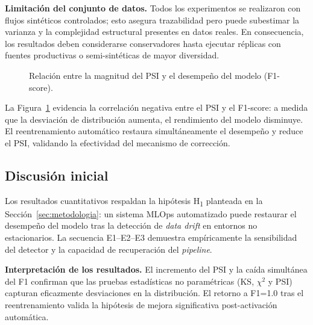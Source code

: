 \noindent\textbf{Limitación del conjunto de datos.} Todos los experimentos se realizaron con flujos sintéticos controlados; esto asegura trazabilidad pero puede subestimar la varianza y la complejidad estructural presentes en datos reales. En consecuencia, los resultados deben considerarse conservadores hasta ejecutar réplicas con fuentes productivas o semi-sintéticas de mayor diversidad.

\begin{figure}[H]
\centering
{}
\caption{Relación entre la magnitud del PSI y el desempeño del modelo (F1-score).}
\label{fig:psi-f1}
\end{figure}


La Figura~\ref{fig:psi-f1} evidencia la correlación negativa entre el PSI y el F1-score: a medida que la desviación de distribución aumenta, el rendimiento del modelo disminuye. El reentrenamiento automático restaura simultáneamente el desempeño y reduce el PSI, validando la efectividad del mecanismo de corrección.

\subsection{Discusión inicial}
Los resultados cuantitativos respaldan la hipótesis H\textsubscript{1} planteada en la Sección~\ref{sec:metodologia}: un sistema MLOps automatizado puede restaurar el desempeño del modelo tras la detección de \textit{data drift} en entornos no estacionarios. La secuencia E1–E2–E3 demuestra empíricamente la sensibilidad del detector y la capacidad de recuperación del \textit{pipeline}.

\textbf{Interpretación de los resultados.}  
El incremento del PSI y la caída simultánea del F1 confirman que las pruebas estadísticas no paramétricas (KS, $\chi^2$ y PSI) capturan eficazmente desviaciones en la distribución. El retorno a F1=1.0 tras el reentrenamiento valida la hipótesis de mejora significativa post-activación automática.

